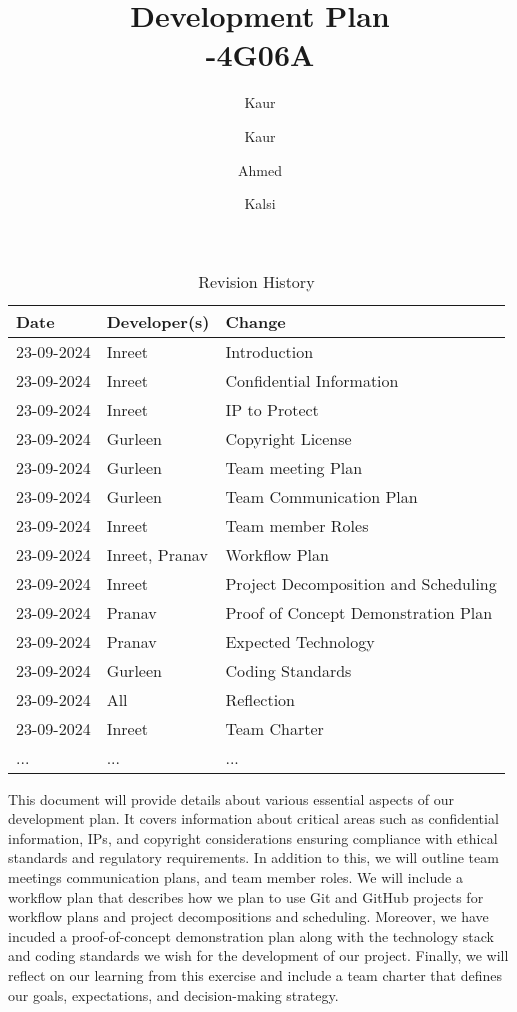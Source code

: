 \documentclass{article}
\title{Development Plan\\\SFWRENG-4G06A}
\author{\Gurleen Kaur}
\author{\Inreet Kaur}
\author{\Moamen Ahmed}
\author{\Pranav Kalsi}
\date{}
\begin{document}
\maketitle

\begin{table}[hp]
\caption{Revision History} \label{TblRevisionHistory}
\begin{tabularx}{\textwidth}{llX}
\toprule
\textbf{Date} & \textbf{Developer(s)} & \textbf{Change}\\
\midrule
23-09-2024 & Inreet & Introduction\\
23-09-2024 & Inreet & Confidential Information\\
23-09-2024 & Inreet & IP to Protect\\
23-09-2024 & Gurleen & Copyright License\\
23-09-2024 & Gurleen & Team meeting Plan\\
23-09-2024 & Gurleen & Team Communication Plan\\
23-09-2024 & Inreet & Team member Roles\\
23-09-2024 & Inreet, Pranav & Workflow Plan\\
23-09-2024 & Inreet & Project Decomposition and Scheduling\\
23-09-2024 & Pranav & Proof of Concept Demonstration Plan\\
23-09-2024 & Pranav & Expected Technology\\
23-09-2024 & Gurleen & Coding Standards\\
23-09-2024 & All & Reflection\\
23-09-2024 & Inreet & Team Charter\\
... & ... & ...\\
\bottomrule
\end{tabularx}
\end{table}

\newpage{}

This document will provide details about various essential aspects of our development plan. It covers information about critical areas such as confidential information, IPs, and copyright considerations ensuring compliance with ethical standards and regulatory requirements. In addition to this, we will outline team meetings communication plans, and team member roles. We will include a workflow plan that describes how we plan to use Git and GitHub projects for workflow plans and project decompositions and scheduling. Moreover, we have incuded a proof-of-concept demonstration plan along with the technology stack and coding standards we wish for the development of our project. Finally, we will reflect on our learning from this exercise and include a team charter that defines our goals, expectations, and decision-making strategy. 
\end{document}
